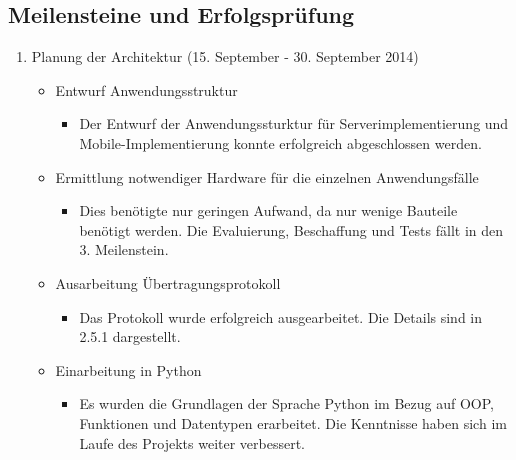 \subsection{Meilensteine und Erfolgsprüfung}
\begin{enumerate}

\item Planung der Architektur (15. September - 30. September 2014)
\begin{itemize}
\item Entwurf Anwendungsstruktur
\begin{itemize}
\item Der Entwurf der Anwendungssturktur für Serverimplementierung und Mobile-Implementierung konnte erfolgreich abgeschlossen werden.
\end{itemize}
\item Ermittlung notwendiger Hardware für die einzelnen Anwendungsfälle
\begin{itemize}
\item Dies benötigte nur geringen Aufwand, da nur wenige Bauteile benötigt werden. Die Evaluierung, Beschaffung und Tests fällt in den 3. Meilenstein.
\end{itemize}
\item Ausarbeitung Übertragungsprotokoll
\begin{itemize}
\item Das Protokoll wurde erfolgreich ausgearbeitet. Die Details sind in 2.5.1 dargestellt.
\end{itemize}
\item Einarbeitung in Python
\begin{itemize}
\item Es wurden die Grundlagen der Sprache Python im Bezug auf OOP, Funktionen und Datentypen erarbeitet. Die Kenntnisse haben sich im Laufe des Projekts weiter verbessert. 
\end{itemize}
\end{itemize}


\end{enumerate}
